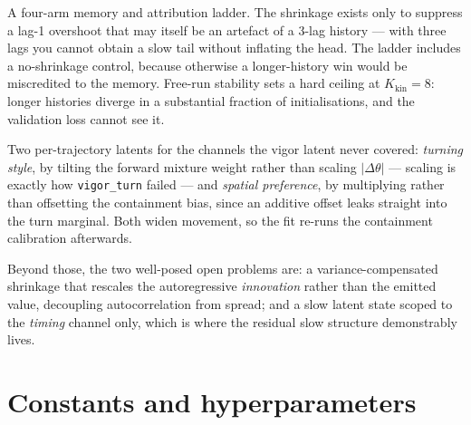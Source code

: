 \documentclass[11pt,a4paper]{article}
\newcommand{\dth}{\ensuremath{\Delta\theta}}
\newcommand{\code}[1]{\texttt{\small #1}}
\begin{document}
\begin{description}\itemsep3pt
\item[\code{mem}] A four-arm memory and attribution ladder. The shrinkage exists only to
      suppress a lag-1 overshoot that may itself be an artefact of a 3-lag history --- with
      three lags you cannot obtain a slow tail without inflating the head. The ladder
      includes a no-shrinkage control, because otherwise a longer-history win would be
      miscredited to the memory. Free-run stability sets a hard ceiling at
      $K_{\mathrm{kin}} = 8$: longer histories diverge in a substantial fraction of
      initialisations, and the validation loss cannot see it.
\item[\code{indiv}] Two per-trajectory latents for the channels the vigor latent never
      covered: \emph{turning style}, by tilting the forward mixture weight rather than
      scaling $|\dth|$ --- scaling is exactly how \code{vigor\_turn} failed --- and
      \emph{spatial preference}, by multiplying rather than offsetting the containment
      bias, since an additive offset leaks straight into the turn marginal. Both widen
      movement, so the fit re-runs the containment calibration afterwards.
\end{description}

Beyond those, the two well-posed open problems are: a variance-compensated shrinkage that
rescales the autoregressive \emph{innovation} rather than the emitted value, decoupling
autocorrelation from spread; and a slow latent state scoped to the \emph{timing} channel
only, which is where the residual slow structure demonstrably lives.

\appendix
\section{Constants and hyperparameters}
\end{document}
